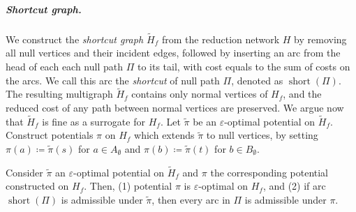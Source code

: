 \documentclass[a4paper,UKenglish]{socg-lipics-v2018}
\makeatletter
\def\eps{\varepsilon}
\def\short{\operatorname{short}}
\theoremstyle{plain}
\numberwithin{figure}{section}
\renewcommand{\paragraph}{\subparagraph}
\def\EMPH#1{\textcolor{BrickRed}{{\emph{#1}}}}
\def\n@te#1{\textsf{\boldmath \textbf{$\langle\!\langle$#1$\rangle\!\rangle$}}\leavevmode}
\def\note#1{\textcolor{red}{\n@te{#1}}}
\renewcommand{\note}[1]{} %
\makeatother
\begin{document}
\paragraph{Shortcut graph.}
We construct the \EMPH{shortcut graph $\tilde{H}_f$} from the reduction network $H$ by removing all
null vertices and their incident edges, followed by inserting an arc
from the head of each each null path $\Pi$ to its tail, with cost equals to the sum of costs on the arcs.
We call this arc the \EMPH{shortcut} of null path $\Pi$, denoted as \EMPH{$\short(\Pi)$}.
%
The resulting multigraph $\tilde{H}_f$ contains only normal vertices of $H_f$, and the reduced cost of any path between normal vertices are preserved.
%
We argue now that $\tilde{H}_f$ is fine as a surrogate for $H_f$.
%
Let $\tilde{\pi}$ be an $\eps$-optimal potential on $\tilde{H}_f$.
Construct potentials $\pi$ on $H_f$ which extends $\tilde{\pi}$ to null vertices, by
setting $\pi(a) \coloneqq \tilde{\pi}(s)$ for $a \in A_\emptyset$ and
$\pi(b) \coloneqq \tilde{\pi}(t)$ for $b \in B_\emptyset$.

\begin{lemmarep}
\label{lemma:empty_correct}
Consider $\tilde{\pi}$ an $\eps$-optimal potential on $\tilde{H}_f$ and $\pi$ the corresponding potential constructed on $H_f$.
Then,
(1) potential $\pi$ is $\eps$-optimal on  $H_f$, and
(2) if arc $\short(\Pi)$ is admissible under $\tilde{\pi}$, then every arc in $\Pi$ is admissible under $\pi$.
\end{lemmarep}
\end{document}
